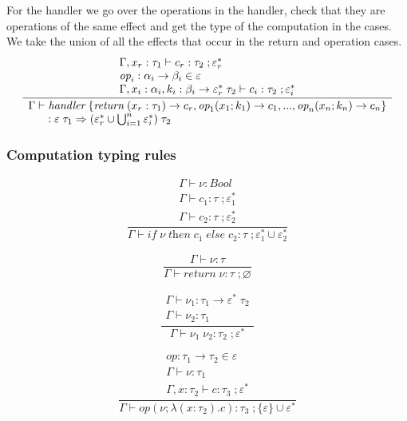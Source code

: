 \documentclass[12pt]{article}
\newcommand\eff[0]{\varepsilon}
\newcommand\effs[0]{\eff^*}
\newcommand\eop[0]{\textit{op}}
\newcommand\type[0]{\tau}
\newcommand\tbool[0]{\textit{Bool}}
\newcommand\tarr[2]{#1 \rightarrow #2}
\newcommand\tarre[3]{#1 \rightarrow #2 \; #3}
\newcommand\thandler[4]{#1 \; #2 \Rightarrow #3 \; #4}
\newcommand\val[0]{\nu}
\newcommand\vhandler[1]{\textit{handler} \; \{#1\}}
\newcommand\comp[0]{c}
\newcommand\cif[3]{\textit{if} \; #1 \; \textit{then} \; #2 \; \textit{else} \; #3}
\newcommand\creturn[1]{\textit{return} \; #1}
\newcommand\capp[2]{#1 \; #2}
\newcommand\cop[5]{#1(#2 ; \lambda (#3 : #4) . #5)}
\begin{document}
\newpage
For the handler we go over the operations in the handler, check that they are operations of the same effect and get the type of the computation in the cases. We take the union of all the effects that occur in the return and operation cases.
\[\frac{
	\begin{array}{l}
	\Gamma , x_r : \type_1 \vdash \comp_r : \type_2 \; ; \effs_r \\
	\eop_i : \tarr{\alpha_i}{\beta_i} \in \eff \\
	\Gamma , x_i : \alpha_i , k_i : \tarre{\beta_i}{\effs_r}{\type_2} \vdash \comp_i : \type_2 \; ; \effs_i
	\end{array}
}{
	\begin{array}{l}
	\Gamma \vdash \vhandler{
		\textit{return} \; (x_r:\type_1) \rightarrow \comp_r,
		\eop_1 ( x_1 ; k_1 ) \rightarrow \comp_1,
		...,
		\eop_n ( x_n ; k_n ) \rightarrow \comp_n
	} \\ \indent : \thandler{\eff}{\type_1}{(\effs_r \cup \bigcup_{i=1}^n \effs_i)}{\type_2}
	\end{array}
}\]

\subsubsection{Computation typing rules}
\begin{minipage}{0.5\textwidth}
\[\frac{
	\begin{array}{l}
	\Gamma \vdash \val : \tbool \\
	\Gamma \vdash \comp_1 : \type \; ; \effs_1 \\
	\Gamma \vdash \comp_2 : \type \; ; \effs_2
	\end{array}
}{
	\Gamma \vdash \cif{\val}{\comp_1}{\comp_2} : \type \; ; \effs_1 \cup \effs_2
}\]
\end{minipage}
\vspace{10pt}
\begin{minipage}{0.5\textwidth}
\[\frac{
	\begin{array}{l}
	\Gamma \vdash \val : \type
	\end{array}
}{
	\Gamma \vdash \creturn{\val} : \type \; ; \varnothing
}\]
\end{minipage}
\begin{minipage}{0.5\textwidth}
\[\frac{
	\begin{array}{l}
	\Gamma \vdash \val_1 : \tarre{\type_1}{\effs}{\type_2} \\
	\Gamma \vdash \val_2 : \type_1
	\end{array}
}{
	\Gamma \vdash \capp{\val_1}{\val_2} : \type_2 \; ; \effs
}\]
\end{minipage}
\begin{minipage}{0.5\textwidth}
\[\frac{
	\begin{array}{l}
	\eop : \tarr{\type_1}{\type_2} \in \eff \\
	\Gamma \vdash \val : \type_1 \\
	\Gamma , x : \type_2 \vdash \comp : \type_3 \; ; \effs
	\end{array}
}{
	\Gamma \vdash \cop{\eop}{\val}{x}{\type_2}{\comp} : \type_3 \; ; \{ \eff \} \cup \effs
}\]
\end{minipage}
\end{document}
